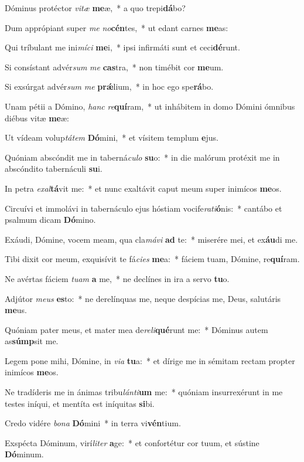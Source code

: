 \item Dóminus protéctor \textit{vi}\textit{tæ} \textbf{me}æ,~* a quo trepi\textbf{dá}bo?
\item Dum apprópiant super \textit{me} \textit{no}\textbf{cén}tes,~* ut edant carnes \textbf{me}as:
\item Qui tríbulant me ini\textit{mí}\textit{ci} \textbf{me}i,~* ipsi infirmáti sunt et ceci\textbf{dé}runt.
\item Si consístant advér\textit{sum} \textit{me} \textbf{cas}tra,~* non timébit cor \textbf{me}um.
\item Si exsúrgat advér\textit{sum} \textit{me} \textbf{prǽ}lium,~* in hoc ego spe\textbf{rá}bo.
\item Unam pétii a Dómino, \textit{hanc} \textit{re}\textbf{quí}ram,~* ut inhábitem in domo Dómini ómnibus diébus vitæ \textbf{me}æ:
\item Ut vídeam volup\textit{tá}\textit{tem} \textbf{Dó}mini,~* et vísitem templum \textbf{e}jus.
\item Quóniam abscóndit me in taberná\textit{cu}\textit{lo} \textbf{su}o:~* in die malórum protéxit me in abscóndito tabernáculi \textbf{su}i.
\item In petra \textit{ex}\textit{al}\textbf{tá}vit me:~* et nunc exaltávit caput meum super inimícos \textbf{me}os.
\item Circuívi et immolávi in tabernáculo ejus hóstiam vocife\textit{ra}\textit{ti}\textbf{ó}nis:~* cantábo et psalmum dicam \textbf{Dó}mino.
\item Exáudi, Dómine, vocem meam, qua cla\textit{má}\textit{vi} \textbf{ad} te:~* miserére mei, et ex\textbf{áu}di me.
\item Tibi dixit cor meum, exquisívit te fá\textit{ci}\textit{es} \textbf{me}a:~* fáciem tuam, Dómine, re\textbf{quí}ram.
\item Ne avértas fáciem \textit{tu}\textit{am} \textbf{a} me,~* ne declínes in ira a servo \textbf{tu}o.
\item Adjútor \textit{me}\textit{us} \textbf{es}to:~* ne derelínquas me, neque despícias me, Deus, salutáris \textbf{me}us.
\item Quóniam pater meus, et mater mea de\textit{re}\textit{li}\textbf{qué}runt me:~* Dóminus autem as\textbf{súmp}sit me.
\item Legem pone mihi, Dómine, in \textit{vi}\textit{a} \textbf{tu}a:~* et dírige me in sémitam rectam propter inimícos \textbf{me}os.
\item Ne tradíderis me in ánimas tribu\textit{lán}\textit{ti}\textbf{um} me:~* quóniam insurrexérunt in me testes iníqui, et mentíta est iníquitas \textbf{si}bi.
\item Credo vidére \textit{bo}\textit{na} \textbf{Dó}mini~* in terra vi\textbf{vén}tium.
\item Exspécta Dóminum, virí\textit{li}\textit{ter} \textbf{a}ge:~* et confortétur cor tuum, et sústine \textbf{Dó}minum.
